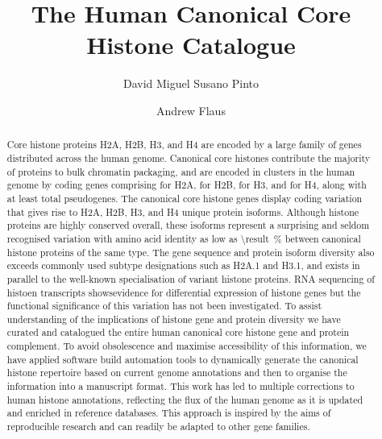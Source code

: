 \documentclass[a4paper,oneside,onecolumn,article,draft]{memoir}
\author{David Miguel Susano Pinto \and Andrew Flaus}
\title{The Human Canonical Core Histone Catalogue}
\begin{document}
  \maketitle

  \begin{abstract}
    Core histone proteins H2A, H2B, H3, and H4 are encoded
    by a large family of genes distributed across the human genome.
    Canonical core histones contribute the majority of proteins to bulk
    chromatin packaging,
    and are encoded in \NumberOfClusters{} clusters in the human genome
    by \TotalCoreCodingGenes{} coding genes comprising
    \HTwoACodingGenes{} for H2A,
    \HTwoBCodingGenes{} for H2B,
    \HThreeCodingGenes{} for H3,
    and \HFourCodingGenes{} for H4,
    along with at least \TotalCorePseudoGenes{} total pseudogenes.
    The canonical core histone genes display coding variation that gives rise to
    \HTwoAUniqueProteins{} H2A, \HTwoBUniqueProteins{} H2B,
    \HThreeUniqueProteins{} H3, and \HFourUniqueProteins{} H4 unique protein isoforms.
    Although histone proteins are highly conserved overall, 
    these isoforms represent a surprising and seldom recognised variation
    with amino acid identity as low as
     \SI{\result}{\percent}
    between canonical histone proteins of the same type.
    The gene sequence and protein isoform diversity
    also exceeds commonly used subtype designations such as H2A.1 and H3.1,
    and exists in parallel to the well-known specialisation of variant histone proteins.
    RNA sequencing of histoen transcripts showsevidence for 
    differential expression of histone genes 
    but the functional significance of this variation has not been investigated.
    To assist understanding of the implications of histone gene and protein diversity
    we have curated and catalogued the entire human canonical core
    histone gene and protein complement.
    To avoid obsolescence and maximise accessibility of this information,
    we have applied software build automation tools to
    dynamically generate the canonical histone repertoire
    based on current genome annotations
    and then to organise the information into a manuscript format.
    This work has led to multiple corrections to human histone annotations,
    reflecting the flux of the human genome as it is updated and
    enriched in reference databases.
    This approach is inspired by the aims of reproducible research
    and can readily be adapted to other gene families.
  \end{abstract}
\end{document}
